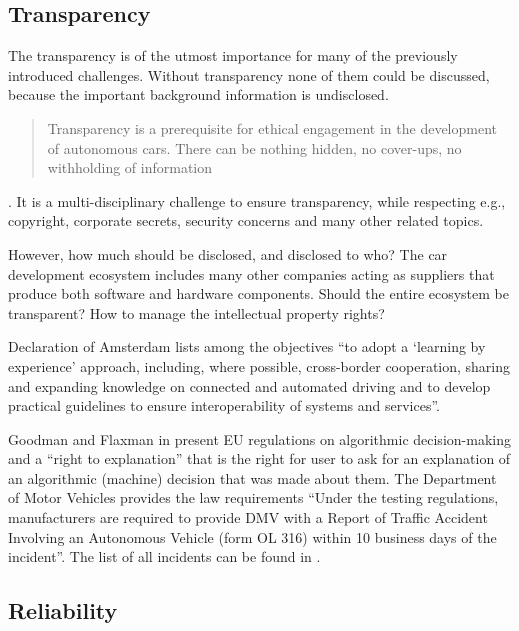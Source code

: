 \subsection{Transparency}
\label{sec:EAofTC:Transparency}

The transparency is of the utmost importance for many of the previously introduced challenges. Without transparency none of them could be discussed, because the important background information is undisclosed. \blockquote{Transparency is a prerequisite for ethical engagement in the development of autonomous cars. There can be nothing hidden, no cover-ups, no withholding of information} \cite{McBride:2016:EDC:2874239.2874265}. It is a multi-disciplinary challenge to ensure transparency, while respecting e.g., copyright, corporate secrets, security concerns and many other related topics. 

However, how much should be disclosed, and disclosed to who? The car development ecosystem includes many other companies acting as suppliers that produce both software and hardware components. Should the entire ecosystem be transparent? How to manage the intellectual property rights?

Declaration of Amsterdam \cite{GovernmentNL2017} lists among the objectives \enquote{to adopt a \enquote{learning by experience} approach, including, where possible, cross-border cooperation, sharing and expanding knowledge on connected and automated driving and to develop practical guidelines to ensure interoperability of systems and services}.

Goodman and Flaxman in \cite{2016arXiv160608813G_GoodmanFlaxman} present EU regulations on algorithmic decision-making and a \enquote{right to explanation} that is the right for user to ask for an explanation of an algorithmic (machine) decision that was made about them.
The Department of Motor Vehicles provides the law requirements \cite{DepartmentofMotorVehiclesStateofCalifornia} \enquote{Under the testing regulations, manufacturers are required to provide DMV with a Report of Traffic Accident Involving an Autonomous Vehicle (form OL 316) within 10 business days of the incident}. The list of all incidents can be found in \cite{DepartmentofMotorVehiclesStateofCalifornia_OL316Reports}.


\subsection{Reliability}
\label{sec:EAofTC:Reliability}

